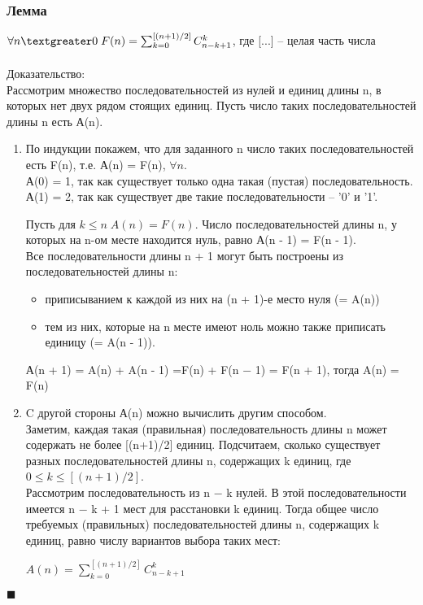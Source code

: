 \documentclass{article}
\begin{document}
        \subsubsection{Лемма}
        $\forall n \textgreater 0\; F(n) = \sum_{k = 0}^{[(n + 1)/2]} C_{n-k+1}^{k}$, где [...] -- целая часть числа\\
        \\Доказательство:\\ 
        Рассмотрим множество последовательностей из нулей и единиц длины n, в которых нет двух рядом стоящих единиц. Пусть число таких последовательностей длины n есть А(n).
        \begin{enumerate}
            \item По индукции покажем, что для заданного n число таких последовательностей есть F(n), т.е. А(n) = F(n), $\forall n$.\\
            А(0) = 1, так как существует только одна такая (пустая) последовательность.\\
            А(1) = 2, так как существует две такие последовательности -- '0' и '1'. 
            
            Пусть для $k \leq n\; A(n) = F(n)$. Число последовательностей длины n, у которых на n-ом месте находится нуль, равно А(n - 1) = F(n - 1).\\
            Все последовательности длины n + 1 могут быть построены из последовательностей длины n:
            \begin{itemize}
                \item приписыванием к каждой из них на (n + 1)-е место нуля (= A(n))
                \item тем из них, которые на n месте имеют ноль можно также приписать единицу (= A(n - 1)).
            \end{itemize}
            
            А(n + 1) = A(n) + A(n - 1) =F(n) + F(n − 1) = F(n + 1), тогда A(n) = F(n) 
            
            \item C другой стороны А(n) можно вычислить другим способом.\\
            Заметим, каждая такая (правильная) последовательность длины n может содержать не более [(n+1)/2] единиц. Подсчитаем, сколько существует разных последовательностей длины n, содержащих k единиц, где $0 \leq k \leq [(n + 1)/2]$. \\
            Рассмотрим последовательность из n − k нулей. В этой последовательности имеется n − k + 1 мест для расстановки k единиц. Тогда общее число требуемых (правильных) последовательностей длины n, содержащих k единиц, равно числу вариантов выбора таких мест:
            
            $A(n) = \sum_{k = 0}^{[(n + 1)/2]} C_{n-k+1}^{k}$
        \end{enumerate}
        \begin{flushright}
            $\blacksquare$\\
        \end{flushright}
        
\end{document}
